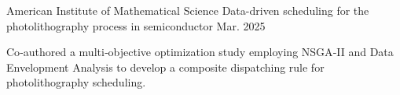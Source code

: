 

\begin{cventries}

  \cventry
    {\sloppy American Institute of Mathematical Science}%
    {Data-driven scheduling for the photolithography process in semiconductor} %
    {Mar. 2025} %
    {} %
    {
      \begin{cvitems} %
        \item {Co‑authored a multi‑objective optimization study employing NSGA‑II and Data Envelopment Analysis to develop a composite dispatching rule for photolithography scheduling.}
      \end{cvitems}
    }

\end{cventries}
